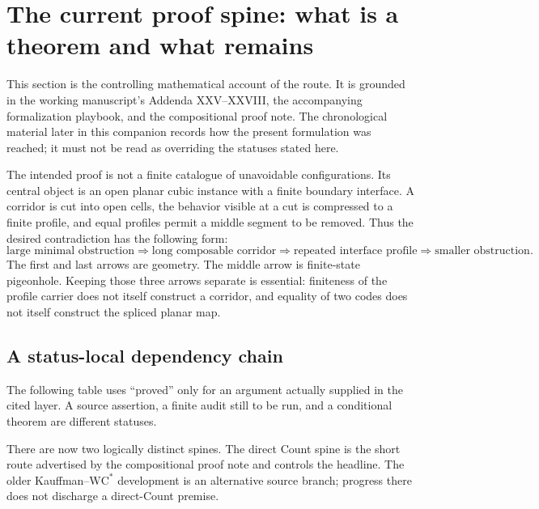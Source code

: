 
\section{The current proof spine: what is a theorem and what remains}
\label{sec:compositional-proof-spine}

This section is the controlling mathematical account of the route.  It is
grounded in the working manuscript's Addenda XXV--XXVIII, the accompanying
formalization playbook, and the compositional proof note.  The chronological
material later in this companion records how the present formulation was
reached; it must not be read as overriding the statuses stated here.

The intended proof is not a finite catalogue of unavoidable configurations.
Its central object is an open planar cubic instance with a finite boundary
interface.  A corridor is cut into open cells, the behavior visible at a cut
is compressed to a finite profile, and equal profiles permit a middle segment
to be removed.  Thus the desired contradiction has the following form:
\[
  \text{large minimal obstruction}
  \Longrightarrow \text{long composable corridor}
  \Longrightarrow \text{repeated interface profile}
  \Longrightarrow \text{smaller obstruction}.
\]
The first and last arrows are geometry.  The middle arrow is finite-state
pigeonhole.  Keeping those three arrows separate is essential: finiteness of
the profile carrier does not itself construct a corridor, and equality of two
codes does not itself construct the spliced planar map.

\subsection{A status-local dependency chain}

The following table uses ``proved'' only for an argument actually supplied in
the cited layer.  A source assertion, a finite audit still to be run, and a
conditional theorem are different statuses.

There are now two logically distinct spines.  The direct Count spine is the
short route advertised by the compositional proof note and controls the
headline.  The older Kauffman--$\mathrm{WC}^{*}$ development is an alternative
source branch; progress there does not discharge a direct-Count premise.

